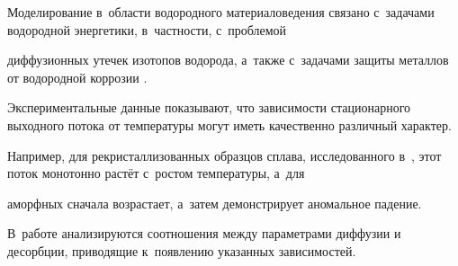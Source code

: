 














\date{20/XII/2010}






\maketitle







 Моделирование в~области водородного материаловедения связано с~задачами водородной энергетики, в~частности, с~проблемой

диффузионных утечек изотопов водорода, а~также с~задачами защиты металлов от водородной коррозии \cite{bormatova:bib:Vodorod, bormatova:bib:Vodorod1}.

Экспериментальные данные показывают, что зависимости стационарного выходного потока от температуры могут иметь качественно различный характер.

Например, для рекристаллизованных образцов сплава, исследованного в~\cite{bormatova:bib:Evard}, этот поток монотонно растёт с~ростом температуры, а~для

аморфных сначала возрастает, а~затем демонстрирует аномальное падение.

В~работе анализируются соотношения между параметрами диффузии и десорбции, приводящие к~появлению указанных за\-висимостей.



